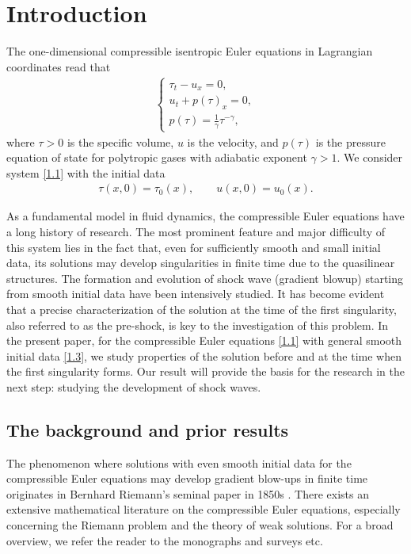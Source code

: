 \documentclass[11pt,reqno]{article}
\newcommand{\dps}{\displaystyle}
\newcommand{\fr}{\frac}
\numberwithin{equation}{section}
\begin{document}
\tableofcontents

\section{Introduction}\label{S1}

The one-dimensional compressible isentropic Euler equations in Lagrangian coordinates read that \cite{CF, Daf}
\begin{align}\label{1.1}
\left\{
\begin{array}{l}
\dps \tau_t-u_x=0, \\[6pt]
\dps u_t+p(\tau)_x=0, \\[6pt]
\dps p(\tau)=\fr{1}{\gamma}\tau^{-\gamma},
\end{array}
\right.
\end{align}
where $\tau>0$ is the specific volume, $u$ is the velocity, and $p(\tau)$ is the pressure equation of state for polytropic gases with adiabatic exponent $\gamma>1$.
We consider system \eqref{1.1} with the initial data
\begin{align}\label{1.3}
\tau(x,0)=\tau_0(x),\qquad u(x,0)=u_0(x).
\end{align}

As a fundamental model in fluid dynamics, the compressible Euler equations have a long history of research. The most prominent feature and major difficulty of this system lies in the fact that, even for sufficiently smooth and small initial data, its solutions may develop singularities in finite time due
to the quasilinear structures. The formation and evolution of shock wave (gradient blowup) starting from smooth initial data have been intensively studied.
It has become evident that a precise characterization of the solution at the time of the first singularity, also referred to as the pre-shock, is key to the investigation of this problem. In the present paper, for the compressible Euler equations \eqref{1.1} with general smooth initial data \eqref{1.3}, we study properties of the solution before and at the time when the
first singularity forms. Our result will provide the basis for the research in the next step: studying the development of shock waves.



\subsection{The background and prior results}\label{S11}
The phenomenon where solutions with even smooth initial data for the compressible Euler equations may develop gradient blow-ups in finite time originates in Bernhard Riemann's seminal paper in 1850s \cite{Rie}.
There exists an extensive mathematical literature on the compressible Euler equations, especially concerning the Riemann problem and the theory of weak solutions. For a broad overview, we refer the reader to the monographs and surveys \cite{Bre, CW, Daf, Maj} etc.
\end{document}
